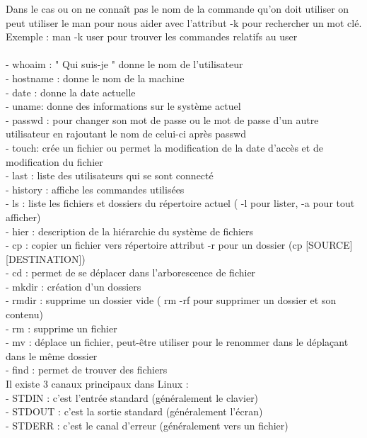 \documentclass[11pt,a4peper]{article}
\begin{document}
Dans le cas ou on ne connaît pas le nom de la commande qu’on doit utiliser on peut utiliser le man pour nous aider avec l’attribut -k pour rechercher un mot clé.\\
Exemple : man -k user      pour trouver les commandes relatifs au user\\
\\
- whoaim : " Qui suis-je " donne le nom de l’utilisateur\\
- hostname : donne le nom de la machine\\
- date : donne la date actuelle\\
- uname: donne des informations sur le système actuel\\
- passwd : pour changer son mot de passe ou le mot de passe d’un autre utilisateur en rajoutant le     nom de celui-ci après passwd\\
- touch: crée un fichier ou permet la modification de la date d’accès et de modification du fichier\\
- last : liste des utilisateurs qui se sont connecté \\
- history : affiche les commandes utilisées\\
- ls : liste les fichiers et dossiers du répertoire actuel ( -l pour lister, -a pour tout afficher)\\
- hier : description de la hiérarchie du système de fichiers\\
- cp : copier un fichier vers répertoire attribut -r  pour un dossier (cp [SOURCE] [DESTINATION])\\
- cd : permet de se déplacer dans l’arborescence de fichier\\
- mkdir : création d’un dossiers\\
- rmdir : supprime un dossier vide ( rm -rf  pour supprimer un dossier et son contenu)\\
- rm : supprime un fichier\\
- mv : déplace un fichier, peut-être utiliser pour le renommer dans le déplaçant dans le même dossier\\
- find : permet de trouver des fichiers \\

Il existe 3 canaux principaux dans Linux :\\
- STDIN : c’est l’entrée standard (généralement le clavier)\\
- STDOUT : c’est la sortie standard (généralement l’écran)\\
- STDERR : c’est le canal d’erreur (généralement vers un fichier)\\
\end{document}
